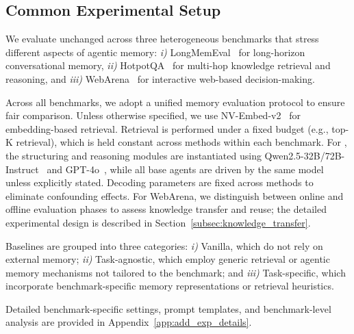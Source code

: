 \subsection{Common Experimental Setup}

We evaluate \plugmem unchanged across three heterogeneous benchmarks that stress different aspects of agentic memory: 
\textit{i)} LongMemEval~\citep{wu2024longmemeval} for long-horizon conversational memory,
\textit{ii)} HotpotQA~\citep{yang2018hotpotqadatasetdiverseexplainable} for multi-hop knowledge retrieval and reasoning, and 
\textit{iii)} WebArena~\citep{zhou2024webarenarealisticwebenvironment} for interactive web-based decision-making.

Across all benchmarks, we adopt a unified memory evaluation protocol to ensure fair comparison.
Unless otherwise specified, we use NV-Embed-v2~\citep{lee2025nvembedimprovedtechniquestraining} for embedding-based retrieval.
Retrieval is performed under a fixed budget (e.g., top-K retrieval), which is held constant across methods within each benchmark.
For \plugmem, the structuring and reasoning modules are instantiated using Qwen2.5-32B/72B-Instruct~\citep{qwen2025qwen25technicalreport} and GPT-4o~\citep{openai2024gpt4o}, while all base agents are driven by the same model unless explicitly stated.
Decoding parameters are fixed across methods to eliminate confounding effects.
For WebArena, we distinguish between online and offline evaluation phases to assess knowledge transfer and reuse; the detailed experimental design is described in Section~\ref{subsec:knowledge_transfer}.

Baselines are grouped into three categories:
\textit{i)} Vanilla, which do not rely on external memory;
\textit{ii)} Task-agnostic, which employ generic retrieval or agentic memory mechanisms not tailored to the benchmark;
and \textit{iii)} Task-specific, which incorporate benchmark-specific memory representations or retrieval heuristics.

Detailed benchmark-specific settings, prompt templates, and benchmark-level analysis are provided in Appendix~\ref{app:add_exp_details}.





